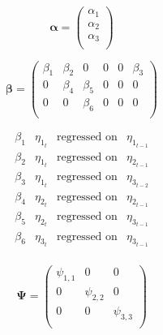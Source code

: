 \documentclass{article}
\begin{document}
\begin{equation}
    \boldsymbol{\alpha}
    =
    \left(
    \begin{array}{c}
        \alpha_{1} \\
        \alpha_{2} \\
        \alpha_{3} \\
    \end{array}
    \right)
\end{equation}

\begin{equation}
    \boldsymbol{\beta}
    =
    \left(
    \begin{array}{cccccc}
        \beta_{1} & \beta_{2} & 0 & 0 & 0 & \beta_{3} \\
        0           & \beta_{4} & \beta_{5} & 0 & 0 & 0 \\
        0           & 0 & \beta_{6} & 0 & 0 & 0 \\
    \end{array}
    \right)
\end{equation}

\begin{equation}
    \begin{array}{c|ccc|}
        \beta_{1} & \eta_{1_{t}} & \text{regressed on} & \eta_{1_{t - 1}} \\
        \beta_{2} & \eta_{1_{t}} & \text{regressed on} & \eta_{2_{t - 1}} \\
        \beta_{3} & \eta_{1_{t}} & \text{regressed on} & \eta_{3_{t - 2}} \\
        \beta_{4} & \eta_{2_{t}} & \text{regressed on} & \eta_{2_{t - 1}} \\
        \beta_{5} & \eta_{2_{t}} & \text{regressed on} & \eta_{3_{t - 1}} \\
        \beta_{6} & \eta_{3_{t}} & \text{regressed on} & \eta_{3_{t - 1}} \\
    \end{array}
\end{equation}

\begin{equation}
    \boldsymbol{\Psi}
    =
    \left(
    \begin{array}{ccc}
        \psi_{1, 1} & 0 & 0 \\
        0 & \psi_{2, 2} & 0 \\
        0 & 0 & \psi_{3, 3} \\
    \end{array}
    \right)
\end{equation}
\end{document}
